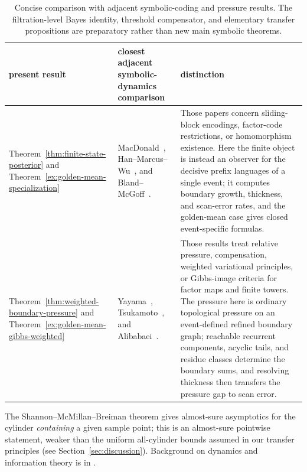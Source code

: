 \documentclass{etds}%
\numberwithin{equation}{section}
\theoremstyle{plain}
\theoremstyle{definition}
\theoremstyle{remark}
\begin{document}
\begin{table}[t]
\centering\small
\setlength{\tabcolsep}{3pt}
\renewcommand{\arraystretch}{1.08}
\begin{tabular}{@{}>{\raggedright\arraybackslash}p{1.55in}>{\raggedright\arraybackslash}p{2.12in}>{\raggedright\arraybackslash}p{2.32in}@{}}
\toprule
present result & closest adjacent symbolic-dynamics comparison & distinction \\
\midrule
Theorem~\ref{thm:finite-state-posterior} and
Theorem~\ref{ex:golden-mean-specialization} &
MacDonald~\cite{MacDonald2024}, Han--Marcus--Wu~\cite{HanMarcusWu2024}, and
Bland--McGoff~\cite{BlandMcGoff2025}. &
Those papers concern sliding-block encodings, factor-code restrictions, or
homomorphism existence.  Here the finite object is instead an observer for the
decisive prefix languages of a single event; it computes boundary growth,
thickness, and scan-error rates, and the golden-mean case gives closed
event-specific formulas. \\
\addlinespace
Theorem~\ref{thm:weighted-boundary-pressure} and
Theorem~\ref{ex:golden-mean-gibbs-weighted} &
Yayama~\cite{Yayama2023RelativePressure,Yayama2026RelativePressureGibbs},
Tsukamoto~\cite{Tsukamoto2023WeightedPressure}, and
Alibabaei~\cite{Alibabaei2025WeightedPressure}. &
Those results treat relative pressure, compensation, weighted variational
principles, or Gibbs-image criteria for factor maps and finite towers.  The
pressure here is ordinary topological pressure on an event-defined refined
boundary graph; reachable recurrent components, acyclic tails, and residue
classes determine the boundary sums, and resolving thickness then transfers
the pressure gap to scan error. \\
\bottomrule
\end{tabular}
\caption{Concise comparison with adjacent symbolic-coding and pressure
results.  The filtration-level Bayes identity, threshold compensator, and
elementary transfer propositions are preparatory rather than new
main symbolic theorems.}
\label{tab:etds-novelty-boundary}
\renewcommand{\arraystretch}{1}
\end{table}
The Shannon--McMillan--Breiman theorem \cite{Shannon1948,McMillan1953,Breiman1957}
gives almost-sure asymptotics for the cylinder \emph{containing} a given
sample point; this is an almost-sure pointwise statement, weaker than the
uniform all-cylinder bounds assumed in our transfer principles (see
Section~\ref{sec:discussion}).  Background on dynamics and information theory
is in \cite{WaltersErgodicTheory,LindMarcus1995,CoverThomas2006,MorseHedlund1940}.
\end{document}
